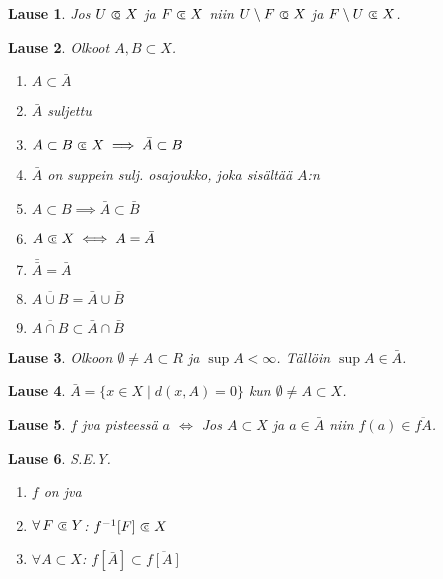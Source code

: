 \documentclass[landscape,a4paper,10pt]{article}
\newcommand\opn{\mathrel{\ooalign{$\subset$\cr
  \hidewidth\hbox{$\circ\mkern.5mu$}\cr}}}
\newcommand\cls{\mathrel{\ooalign{$\subset$\cr
\hidewidth\raise.225ex\hbox{$\text{{\scriptsize c}}\mkern2mu$}\cr}}}
\theoremstyle{customtheoremstyle}
\newtheorem*{theorem}{Lause}
\begin{document}
\begin{multicols*}{3}
\begin{theorem}
  Jos $U \opn X$ ja $F \cls X$ niin $U \setminus F \opn X$ ja $F \setminus U
  \cls X$.
\end{theorem}

\begin{theorem}
  Olkoot $A,B \subset X$.
  \begin{enumerate}
    \item[(1)]{$A \subset \bar{A}$}
    \item[(2)]{$\bar{A}$ suljettu}
    \item[(3)]{$A \subset B \cls X \implies \bar{A} \subset B$}
    \item[(4)]{$\bar{A}$ on suppein sulj. osajoukko, joka sisältää $A$:n}
    \item[(5)]{$A \subset B \implies \bar{A} \subset \bar{B}$}
    \item[(6)]{$A \cls X \iff A = \bar{A}$}
    \item[(7)]{$\bar{\bar{A}} = \bar{A}$}
    \item[(8)]{$\overline{A \cup B} = \bar{A} \cup \bar{B}$}
    \item[(9)]{$\overline{A \cap B} \subset \bar{A} \cap \bar{B}$}
  \end{enumerate}
\end{theorem}

\begin{theorem}
  Olkoon $\emptyset \neq A \subset R$ ja $\sup A < \infty$. Tällöin $\sup A \in
  \bar{A}$.
\end{theorem}

\begin{theorem}
  $\bar{A} = \{ x \in X \; | \; d(x,A) = 0 \}$ kun $\emptyset \neq A \subset X$.
\end{theorem}

\begin{theorem}
  $f$ jva pisteessä $a$ $\iff$ Jos $A \subset X$ ja $a \in \bar{A}$ niin
  $f(a) \in \overline{fA}$.
\end{theorem}

\begin{theorem}
  S.E.Y.
  \begin{enumerate}
    \item[(1)]{$f$ on jva}
    \item[(2)]{$\forall \, F \cls Y$: $f^{-1}[F] \cls X$ }
    \item[(3)]{$\forall A \subset X$: $f[\bar{A}] \subset \overline{f[A]}$}
  \end{enumerate}
\end{theorem}
\end{multicols*}
\end{document}
